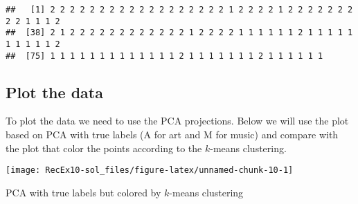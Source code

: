 \documentclass[
]{article}
\newenvironment{Shaded}{\begin{snugshade}}{\end{snugshade}}
\newcommand{\AttributeTok}[1]{\textcolor[rgb]{0.13,0.29,0.53}{#1}}
\newcommand{\CommentTok}[1]{\textcolor[rgb]{0.56,0.35,0.01}{\textit{#1}}}
\newcommand{\DecValTok}[1]{\textcolor[rgb]{0.00,0.00,0.81}{#1}}
\newcommand{\FunctionTok}[1]{\textcolor[rgb]{0.13,0.29,0.53}{\textbf{#1}}}
\newcommand{\NormalTok}[1]{#1}
\newcommand{\SpecialCharTok}[1]{\textcolor[rgb]{0.81,0.36,0.00}{\textbf{#1}}}
\newcommand{\StringTok}[1]{\textcolor[rgb]{0.31,0.60,0.02}{#1}}
\begin{document}
\begin{verbatim}
##   [1] 2 2 2 2 2 2 2 2 2 2 2 2 2 2 2 2 2 2 1 2 2 2 2 1 2 2 2 2 2 2 2 2 2 1 1 1 2
##  [38] 2 1 2 2 2 2 2 2 2 2 2 2 2 2 1 2 2 2 2 1 1 1 1 1 1 2 1 1 1 1 1 1 1 1 1 1 2
##  [75] 1 1 1 1 1 1 1 1 1 1 1 1 1 2 1 1 1 1 1 1 1 2 1 1 1 1 1 1
\end{verbatim}

\subsection{Plot the data}\label{plot-the-data}

To plot the data we need to use the PCA projections. Below we will use
the plot based on PCA with true labels (A for art and M for music) and
compare with the plot that color the points according to the \(k\)-means
clustering.

\begin{Shaded}
\end{Shaded}

\begin{center}\texttt{[image: RecEx10-sol\_files/figure-latex/unnamed-chunk-10-1]} \end{center}

PCA with true labels but colored by \(k\)-means clustering
\end{document}
